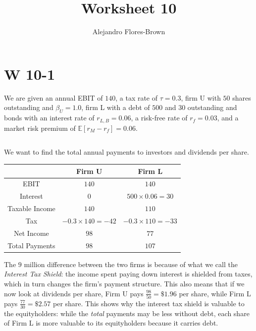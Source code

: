\documentclass[12pt, letterpaper, parskip = full]{article}
\title{Worksheet 10}
\author{Alejandro Flores-Brown}
\newcommand{\Ex}[1]{\mathbb{E}\left[#1\right]}
\begin{document}
	\maketitle

    \section{W 10-1}

    We are given an annual EBIT of \(140\), a tax rate of \(\tau = 0.3\),  firm U with \(50\) shares outstanding and \(\beta_U = 1.0\), firm L with a debt of \(500\) and \(30\) outstanding and bonds with an interest rate of \(r_{L,B} = 0.06\), a risk-free rate of \(r_f = 0.03\), and a market risk premium of \(\Ex{r_M - r_f} = 0.06\).
    
    \subsection{}
    
    We want to find the total annual payments to investors and dividends per share.

    \begin{tabular}{|c|c|c|}
        \hline
        \hline 
        & Firm U & Firm L \\
         \hline
         \hline
         EBIT & \(140\) & \(140\) \\
         \hline
         Interest & \(0\) & \(500 \times 0.06 = 30\) \\
         \hline
         \hline
         Taxable Income & \(140\) & \(110\) \\
         \hline
         Tax & \(-0.3 \times 140 = -42\) & \(-0.3 \times 110 = -33\) \\
         \hline
         \hline
         Net Income & \(98\) & \(77\) \\
         \hline
         \hline
         Total Payments & \(98\) & \(107\) \\
         \hline
         \hline
    \end{tabular}

    The \(9\) million difference between the two firms is because of what we call the \emph{Interest Tax Shield}: the income spent paying down interest is shielded from taxes, which in turn changes the firm's payment structure. This also means that if we now look at dividends per share, Firm U pays \(\frac{98}{50} = \$1.96\) per share, while Firm L pays \(\frac{77}{30} = \$2.57\) per share. This shows why the interest tax shield is valuable to the equityholders: while the \emph{total} payments may be less without debt, each share of Firm L is more valuable to its equityholders because it carries debt.    
\end{document}
